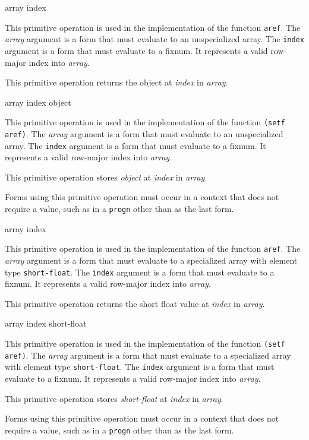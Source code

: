  {array index}

This primitive operation is used in the implementation of the
\commonlisp{} function \texttt{aref}.  The \textit{array} argument
is a form that must evaluate to an unspecialized array.  The
\texttt{index} argument is a form that must evaluate to a fixnum.  It
represents a valid row-major index into \textit{array}.

This primitive operation returns the object at \textit{index} in
\textit{array}.

 {array index object}

This primitive operation is used in the implementation of the
\commonlisp{} function \texttt{(setf aref)}.  The \textit{array} argument
is a form that must evaluate to an unspecialized array.  The
\texttt{index} argument is a form that must evaluate to a fixnum.  It
represents a valid row-major index into \textit{array}.

This primitive operation stores \textit{object} at \textit{index} in
\textit{array}.

Forms using this primitive operation must occur in a context that does
not require a value, such as in a \texttt{progn} other than as the
last form.

 {array index}

This primitive operation is used in the implementation of the
\commonlisp{} function \texttt{aref}.  The \textit{array} argument is
a form that must evaluate to a specialized array with element type
\texttt{short-float}.  The \texttt{index} argument is a form that must
evaluate to a fixnum.  It represents a valid row-major index into
\textit{array}.

This primitive operation returns the short float value at
\textit{index} in \textit{array}.

 {array index short-float}

This primitive operation is used in the implementation of the
\commonlisp{} function \texttt{(setf aref)}.  The \textit{array}
argument is a form that must evaluate to a specialized array with
element type \texttt{short-float}.  The \texttt{index} argument is a
form that must evaluate to a fixnum.  It represents a valid row-major
index into \textit{array}.

This primitive operation stores \textit{short-float} at \textit{index}
in \textit{array}.

Forms using this primitive operation must occur in a context that does
not require a value, such as in a \texttt{progn} other than as the
last form.

